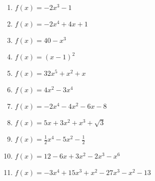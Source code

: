 \documentclass[12pt]{article}
\theoremstyle{definition}
\begin{document}
\begin{multicols}{2}
\begin{enumerate}
\item $f(x)=-2x^3-1$
\item $f(x)=-2x^4 + 4x+1$
\item $f(x)=40-x^3$
\item $f(x)=(x-1)^2$
\item $f(x)=32x^5+x^2+x$
\item $f(x)=4x^2-3x^4$
\item $f(x)=-2x^4-4x^2-6x-8$
\item $f(x)=5x+3x^2+x^3+\sqrt{3}$
\item $f(x)=\frac{1}{2}x^4-5x^2-\frac{1}{2}$
\item $f(x)=12-6x+3x^2-2x^3-x^6$
\item $f(x)=-3x^4+15x^3+x^2-27x^3-x^2-13$
\end{enumerate}
\end{multicols}
\newpage
\ \newpage
\end{document}
